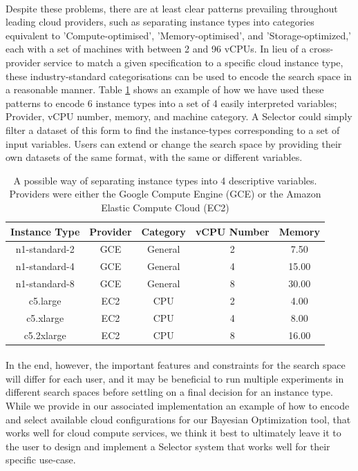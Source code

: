 \documentclass{report}
\begin{document}
\paragraph{}
Despite these problems, there are at least clear patterns prevailing throughout leading cloud providers, such as separating instance types into categories equivalent to 'Compute-optimised', 'Memory-optimised', and 'Storage-optimized,' each with a set of machines with between 2 and 96 vCPUs. In lieu of a cross-provider service to match a given specification to a specific cloud instance type, these industry-standard categorisations can be used to encode the search space in a reasonable manner. Table \ref{tab:config-encode} shows an example of how we have used these patterns to encode 6 instance types into a set of 4 easily interpreted variables; Provider, vCPU number, memory, and machine category. A Selector could simply filter a dataset of this form to find the instance-types corresponding to a set of input variables. Users can extend or change the search space by providing their own datasets of the same format, with the same or different variables.

\begin{table}[!t]
\centering
\begin{tabular}{ |c||c|c|c|c|  }
 \hline
 Instance Type & Provider & Category & vCPU Number & Memory \\
 \hline
 n1-standard-2    & GCE  & General & 2 & 7.50 \\
 n1-standard-4    & GCE  & General & 4 & 15.00 \\
 n1-standard-8    & GCE  & General & 8 & 30.00 \\
 c5.large         & EC2  & CPU & 2 & 4.00 \\
 c5.xlarge    & EC2  & CPU & 4 & 8.00 \\
 c5.2xlarge    & EC2  & CPU & 8 & 16.00 \\
 \hline
\end{tabular}
\caption{A possible way of separating instance types into 4 descriptive variables. Providers were either the Google Compute Engine (GCE) or the Amazon Elastic Compute Cloud (EC2)}
\label{tab:config-encode}
\end{table}

\paragraph{}
In the end,  however, the important features and constraints for the search space will differ for each user, and it may be beneficial to run multiple experiments in different search spaces before settling on a final decision for an instance type. While we provide in our associated implementation an example of how to encode and select available cloud configurations for our Bayesian Optimization tool, that works well for cloud compute services, we think it best to ultimately leave it to the user to design and implement a Selector system that works well for their specific use-case.
\end{document}
